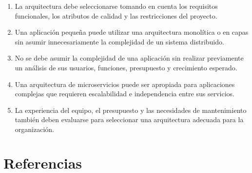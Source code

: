 \documentclass[12pt]{article}
\begin{document}
	\begin{enumerate}
		
		\item La arquitectura debe seleccionarse tomando en cuenta los requisitos
		funcionales, los atributos de calidad y las restricciones del proyecto.
		
		\item Una aplicación pequeña puede utilizar una arquitectura monolítica o
		en capas sin asumir innecesariamente la complejidad de un sistema
		distribuido.
		
		\item No se debe asumir la complejidad de una aplicación sin realizar
		previamente un análisis de sus usuarios, funciones, presupuesto y
		crecimiento esperado.
		
		\item Una arquitectura de microservicios puede ser apropiada para
		aplicaciones complejas que requieren escalabilidad e independencia entre
		sus servicios.
		
		\item La experiencia del equipo, el presupuesto y las necesidades de
		mantenimiento también deben evaluarse para seleccionar una arquitectura
		adecuada para la organización.
		
		
	\end{enumerate}
	
	\section*{Referencias}
	
\end{document}
